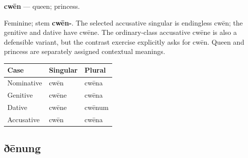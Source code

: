 \par\begin{minipage}{\linewidth}\raggedright
\textbf{cwēn} — queen; princess.

Feminine; stem \textbf{cwēn-}. The selected accusative singular is endingless cwēn; the genitive and dative have cwēne. The ordinary-class accusative cwēne is also a defensible variant, but the contrast exercise explicitly asks for cwēn. Queen and princess are separately assigned contextual meanings.

\par\begingroup
\fontsize{10.5}{13.2}\selectfont
\setlength{\LTleft}{0pt}\setlength{\LTright}{\fill}
\noindent
\begin{tabular}{@{}>{\raggedright\arraybackslash}p{39.46mm}>{\raggedright\arraybackslash}p{39.46mm}>{\raggedright\arraybackslash}p{39.46mm}@{}}
\toprule
\textbf{Case} & \textbf{Singular} & \textbf{Plural} \\
\midrule
Nominative & cwēn & cwēna \\
Genitive & cwēne & cwēna \\
Dative & cwēne & cwēnum \\
Accusative & cwēn & cwēna \\
\bottomrule
\end{tabular}
\par\endgroup

\end{minipage}\par
{}
\subsection*{ðēnung}

